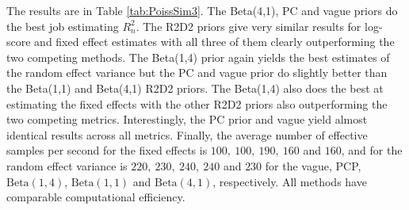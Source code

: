 \documentclass[12pt]{article}
\begin{document}
\begin{comment}
\begin{table}
\centering
    \begin{tabular}{l|ccccc}
        Prior & $R^2_n$ bias & $R^2_n$ MSE & log-score & $||\bbeta-\hat\bbeta||_2$ & $\sigma^2_\alpha$ MSE \\\hline
        Vague & {\bf 0.002} &0.064 &-1.736 &0.565 &0.286 \\
        PCP&0.003 &0.063 &-1.738 &0.563 &0.286 \\
        &\vspace{-10pt}\\
        $R^2\sim\mbox{Beta}(1,4)$ &-0.033 &0.073 &-1.716 &{\bf 0.465} &{\bf 0.242}\\
        $R^2\sim\mbox{Beta}(1,1)$  &-0.013 &0.065 &-1.717 &0.480 &0.291  \\
        $R^2\sim\mbox{Beta}(4,1)$ &-0.003 &{\bf 0.061} &{\bf -1.716} &0.487 &0.297 \\\hline
        S.E. & 0.004 & 0.003 & 0.010 & 0.008 & 0.008
    \end{tabular}
    \caption{Simulation study results for Poisson regression with mixed effects and mean$(R^2)=0.66$ and stdev$(R^2)=0.18$. Averaged over 200 repetitions.  Largest standard errors are in last row and lowest (absolute) value is in bold.}
    \label{tab:PoissSim3}
\end{table}
\end{comment}



The results are in Table \ref{tab:PoissSim3}.
The Beta(4,1), PC and vague priors do the best job estimating $R^2_n$. The R2D2 priors give very similar results for log-score and fixed effect estimates with all three of them clearly outperforming the two competing methods. The Beta(1,4) prior again yields the best estimates of the random effect variance but the PC and vague prior do slightly better than the Beta(1,1) and Beta(4,1) R2D2 priors. The Beta(1,4) also does the best at estimating the fixed effects with the other R2D2 priors also outperforming the two competing metrics. Interestingly, the PC prior and vague yield almost identical results across all metrics. Finally, the average number of effective samples per second for the fixed effects is $100,\ 100,\ 190,\ 160$ and $160$, and for the random effect variance is $220,\ 230,\ 240,\ 240$ and $230$ for the vague, PCP, $\mbox{Beta}(1,4)$, $\mbox{Beta}(1,1)$ and $\mbox{Beta}(4,1)$, respectively. All methods have comparable computational efficiency.
\end{document}
